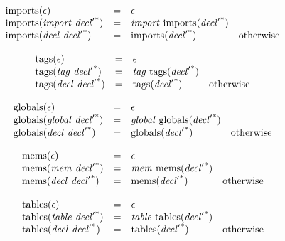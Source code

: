 $$
\begin{array}[t]{@{}lcl@{}l@{}}
{\mathrm{imports}}(\epsilon) & = & \epsilon \\
{\mathrm{imports}}({\mathit{import}}~{{\mathit{decl}'}^\ast}) & = & {\mathit{import}}~{\mathrm{imports}}({{\mathit{decl}'}^\ast}) \\
{\mathrm{imports}}({\mathit{decl}}~{{\mathit{decl}'}^\ast}) & = & {\mathrm{imports}}({{\mathit{decl}'}^\ast}) & \quad \mbox{otherwise} \\
\end{array}
$$

$$
\begin{array}[t]{@{}lcl@{}l@{}}
{\mathrm{tags}}(\epsilon) & = & \epsilon \\
{\mathrm{tags}}({\mathit{tag}}~{{\mathit{decl}'}^\ast}) & = & {\mathit{tag}}~{\mathrm{tags}}({{\mathit{decl}'}^\ast}) \\
{\mathrm{tags}}({\mathit{decl}}~{{\mathit{decl}'}^\ast}) & = & {\mathrm{tags}}({{\mathit{decl}'}^\ast}) & \quad \mbox{otherwise} \\
\end{array}
$$

$$
\begin{array}[t]{@{}lcl@{}l@{}}
{\mathrm{globals}}(\epsilon) & = & \epsilon \\
{\mathrm{globals}}({\mathit{global}}~{{\mathit{decl}'}^\ast}) & = & {\mathit{global}}~{\mathrm{globals}}({{\mathit{decl}'}^\ast}) \\
{\mathrm{globals}}({\mathit{decl}}~{{\mathit{decl}'}^\ast}) & = & {\mathrm{globals}}({{\mathit{decl}'}^\ast}) & \quad \mbox{otherwise} \\
\end{array}
$$

$$
\begin{array}[t]{@{}lcl@{}l@{}}
{\mathrm{mems}}(\epsilon) & = & \epsilon \\
{\mathrm{mems}}({\mathit{mem}}~{{\mathit{decl}'}^\ast}) & = & {\mathit{mem}}~{\mathrm{mems}}({{\mathit{decl}'}^\ast}) \\
{\mathrm{mems}}({\mathit{decl}}~{{\mathit{decl}'}^\ast}) & = & {\mathrm{mems}}({{\mathit{decl}'}^\ast}) & \quad \mbox{otherwise} \\
\end{array}
$$

$$
\begin{array}[t]{@{}lcl@{}l@{}}
{\mathrm{tables}}(\epsilon) & = & \epsilon \\
{\mathrm{tables}}({\mathit{table}}~{{\mathit{decl}'}^\ast}) & = & {\mathit{table}}~{\mathrm{tables}}({{\mathit{decl}'}^\ast}) \\
{\mathrm{tables}}({\mathit{decl}}~{{\mathit{decl}'}^\ast}) & = & {\mathrm{tables}}({{\mathit{decl}'}^\ast}) & \quad \mbox{otherwise} \\
\end{array}
$$

